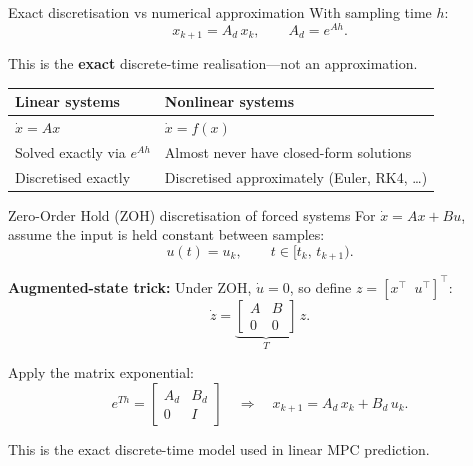 \documentclass[aspectratio=169,10pt]{beamer}
\newcommand{\T}{^\top}
\begin{document}
\begin{frame}{Exact discretisation vs numerical approximation}
With sampling time $h$:
\[
x_{k+1}=A_d\,x_k, \qquad A_d = e^{Ah}.
\]

This is the \textbf{exact} discrete-time realisation---not an approximation.

\begin{center}
\renewcommand{\arraystretch}{1.3}
\begin{tabular}{|p{}|p{}|}
\hline
\textbf{Linear systems} & \textbf{Nonlinear systems}\\
\hline
$\dot{x}=Ax$ & $\dot{x}=f(x)$\\
Solved exactly via $e^{Ah}$ & Almost never have closed-form solutions\\
Discretised exactly & Discretised approximately (Euler, RK4, \ldots)\\
\hline
\end{tabular}
\end{center}
\end{frame}

\begin{frame}{Zero-Order Hold (ZOH) discretisation of forced systems}
For $\dot{x}=Ax+Bu$, assume the input is held constant between samples:
\[
u(t)=u_k,\qquad t\in[t_k,\,t_{k+1}).
\]

\textbf{Augmented-state trick:}
Under ZOH, $\dot{u}=0$, so define $z=[x\T\;\;u\T]\T$:
\[
\dot{z}=
\underbrace{
\begin{bmatrix}
A & B\\ 0 & 0
\end{bmatrix}}_{T}\,z.
\]

Apply the matrix exponential:
\[
e^{Th}=
\begin{bmatrix}
A_d & B_d\\ 0 & I
\end{bmatrix}
\quad\Longrightarrow\quad
\boxed{x_{k+1}=A_d\,x_k + B_d\,u_k}.
\]

This is the exact discrete-time model used in linear MPC prediction.
\end{frame}
\end{document}
